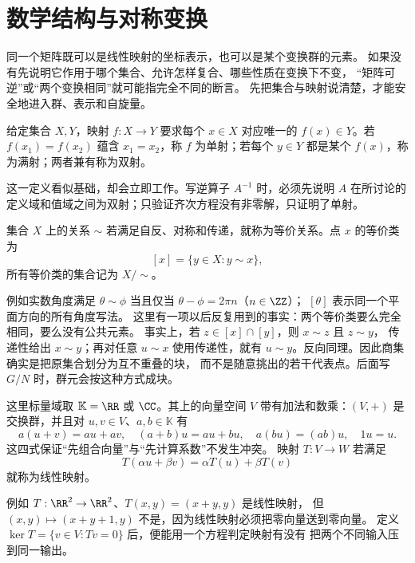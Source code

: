 \chapter{数学结构与对称变换}
\label{chap:math-structures}

同一个矩阵既可以是线性映射的坐标表示，也可以是某个变换群的元素。
如果没有先说明它作用于哪个集合、允许怎样复合、哪些性质在变换下不变，
“矩阵可逆”或“两个变换相同”就可能指完全不同的断言。
先把集合与映射说清楚，才能安全地进入群、表示和自旋量。

\begin{definition}[映射、单射、满射与双射]
给定集合 \(X,Y\)，映射 \(f:X\to Y\) 要求每个 \(x\in X\) 对应唯一的 \(f(x)\in Y\)。若 \(f(x_1)=f(x_2)\) 蕴含 \(x_1=x_2\)，称 \(f\) 为单射；若每个 \(y\in Y\) 都是某个 \(f(x)\)，称为满射；两者兼有称为双射。
\end{definition}

这一定义看似基础，却会立即工作。写逆算子 \(A^{-1}\) 时，必须先说明 \(A\) 在所讨论的定义域和值域之间为双射；只验证齐次方程没有非零解，只证明了单射。

\begin{definition}[等价关系与商集]
集合 \(X\) 上的关系 \(\sim\) 若满足自反、对称和传递，就称为等价关系。点 \(x\) 的等价类为
\[
[x]=\{y\in X:y\sim x\},
\]
所有等价类的集合记为 \(X/{\sim}\)。
\end{definition}

例如实数角度满足 \(\theta\sim\phi\) 当且仅当
\(\theta-\phi=2\pi n\)（\(n\in\ZZ\)）；
\([\theta]\) 表示同一个平面方向的所有角度写法。
这里有一项以后反复用到的事实：两个等价类要么完全相同，要么没有公共元素。
事实上，若 \(z\in[x]\cap[y]\)，则 \(x\sim z\) 且 \(z\sim y\)，
传递性给出 \(x\sim y\)；再对任意 \(u\sim x\) 使用传递性，就有
\(u\sim y\)。反向同理。因此商集确实是把原集合划分为互不重叠的块，
而不是随意挑出的若干代表点。后面写 \(G/N\) 时，群元会按这种方式成块。

\begin{definition}[向量空间与线性映射]
这里标量域取 \(\mathbb K=\RR\) 或 \(\CC\)。其上的向量空间
\(V\) 带有加法和数乘：\((V,+)\) 是交换群，并且对
\(u,v\in V\)、\(a,b\in\mathbb K\) 有
\[
a(u+v)=au+av,\quad (a+b)u=au+bu,\quad
a(bu)=(ab)u,\quad 1u=u.
\]
这四式保证“先组合向量”与“先计算系数”不发生冲突。
映射 \(T:V\to W\) 若满足
\[
T(\alpha u+\beta v)=\alpha T(u)+\beta T(v)
\]
就称为线性映射。
\end{definition}

例如 \(T:\RR^2\to\RR^2\)、\(T(x,y)=(x+y,y)\) 是线性映射，
但 \((x,y)\mapsto(x+y+1,y)\) 不是，因为线性映射必须把零向量送到零向量。
定义 \(\ker T=\{v\in V:Tv=0\}\) 后，便能用一个方程判定映射有没有
把两个不同输入压到同一输出。

